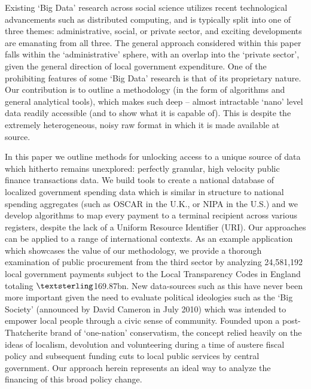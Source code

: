 \documentclass[12pt]{article}
\begin{document}
Existing `Big Data' research across social science utilizes recent technological advancements such as distributed computing, and is typically split into one of three themes: administrative, social, or private sector, and exciting developments are emanating from all three. The general approach considered within this paper falls within the `administrative' sphere, with an overlap into the `private sector', given the general direction of local government expenditure. One of the prohibiting features of some `Big Data' research is that of its proprietary nature. Our contribution is to outline a methodology (in the form of algorithms and general analytical tools), which makes such deep -- almost intractable `nano' level data readily accessible (and to show what it is capable of). This is despite the extremely heterogeneous, noisy raw format in which it is made available at source.

In this paper we outline methods for unlocking access to a unique source of data which hitherto remains unexplored: perfectly granular, high velocity public finance transactions data. We build tools to create a national database of localized government spending data which is similar in structure to national spending aggregates (such as OSCAR in the U.K., or NIPA in the U.S.) and we develop algorithms to map every payment to a terminal recipient across various registers, despite the lack of a Uniform Resource Identifier (URI). Our approaches can be applied to a range of international contexts. As an example application which showcases the value of our methodology, we provide a thorough examination of public procurement from the third sector by analyzing 24,581,192 local government payments subject to the Local Transparency Codes in England totaling $\textsterling$169.87bn. New data-sources such as this have never been more important given the need to evaluate political ideologies such as the `Big Society' (announced by David Cameron in July 2010) which was intended to empower local people through a civic sense of community. Founded upon a post-Thatcherite brand of `one-nation' conservatism, the concept relied heavily on the ideas of localism, devolution and volunteering during a time of austere fiscal policy and subsequent funding cuts to local public services by central government. Our approach herein represents an ideal way to analyze the financing of this broad policy change.
\end{document}

